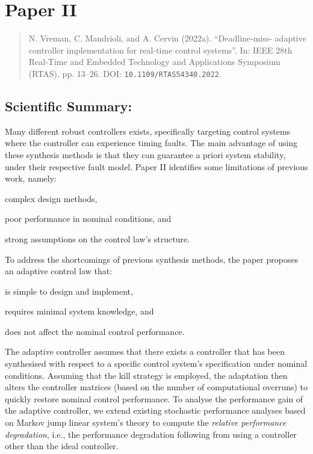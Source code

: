 \documentclass{article}
\begin{document}
\section*{Paper II}%
%
\begin{quote}
N. Vreman, C. Mandrioli, and A. Cervin (2022a). ``Deadline-miss- adaptive controller implementation for real-time control systems''. In: IEEE 28th Real-Time and Embedded Technology and Applications Symposium (RTAS), pp. 13–26. DOI: \texttt{10.1109/RTAS54340.2022}.
\end{quote}

\subsection*{Scientific Summary:}%
%
Many different robust controllers exists, specifically targeting control systems where the controller can experience timing faults.
The main advantage of using these synthesis methods is that they can guarantee a priori system stability, under their respective fault model.
Paper II identifies some limitations of previous work, namely:
\begin{enumerate*}[label=(\roman*)]
    \item complex design methods,
    \item poor performance in nominal conditions, and
    \item strong assumptions on the control law's structure.
\end{enumerate*}

To address the shortcomings of previous synthesis methods, the paper proposes an adaptive control law that:
\begin{enumerate*}[label=(\roman*)]
    \item is simple to design and implement,
    \item requires minimal system knowledge, and
    \item does not affect the nominal control performance.
\end{enumerate*}
The adaptive controller assumes that there exists a controller that has been synthesised with respect to a specific control system's specification under nominal conditions.
Assuming that the kill strategy is employed, the adaptation then alters the controller matrices (based on the number of computational overruns) to quickly restore nominal control performance.
To analyse the performance gain of the adaptive controller, we extend existing stochastic performance analyses based on Markov jump linear system's theory to compute the \emph{relative performance degradation}, i.e., the performance degradation following from using a controller other than the ideal controller.
\end{document}
